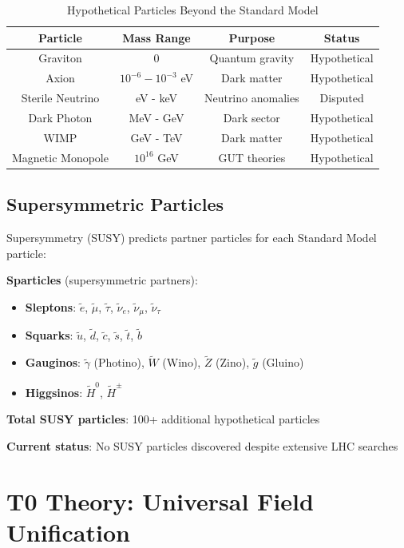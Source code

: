 	\begin{table}[htbp]
		\centering
		\begin{tabular}{|c|c|c|c|}
			\hline
			\textbf{Particle} & \textbf{Mass Range} & \textbf{Purpose} & \textbf{Status} \\
			\hline
			\hline
			Graviton & 0 & Quantum gravity & Hypothetical \\
			Axion & $10^{-6} - 10^{-3}$ eV & Dark matter & Hypothetical \\
			Sterile Neutrino & eV - keV & Neutrino anomalies & Disputed \\
			Dark Photon & MeV - GeV & Dark sector & Hypothetical \\
			WIMP & GeV - TeV & Dark matter & Hypothetical \\
			Magnetic Monopole & $10^{16}$ GeV & GUT theories & Hypothetical \\
			\hline
		\end{tabular}
		\caption{Hypothetical Particles Beyond the Standard Model}
		\label{tab:hypothetical_particles}
	\end{table}
	
	\subsection{Supersymmetric Particles}
	
	Supersymmetry (SUSY) predicts partner particles for each Standard Model particle:
	
	\textbf{Sparticles} (supersymmetric partners):
	\begin{itemize}
		\item \textbf{Sleptons}: $\tilde{e}$, $\tilde{\mu}$, $\tilde{\tau}$, $\tilde{\nu}_e$, $\tilde{\nu}_\mu$, $\tilde{\nu}_\tau$
		\item \textbf{Squarks}: $\tilde{u}$, $\tilde{d}$, $\tilde{c}$, $\tilde{s}$, $\tilde{t}$, $\tilde{b}$
		\item \textbf{Gauginos}: $\tilde{\gamma}$ (Photino), $\tilde{W}$ (Wino), $\tilde{Z}$ (Zino), $\tilde{g}$ (Gluino)
		\item \textbf{Higgsinos}: $\tilde{H}^0$, $\tilde{H}^{\pm}$
	\end{itemize}
	
	\textbf{Total SUSY particles}: 100+ additional hypothetical particles
	
	\textbf{Current status}: No SUSY particles discovered despite extensive LHC searches
	
	\section{T0 Theory: Universal Field Unification}
	
